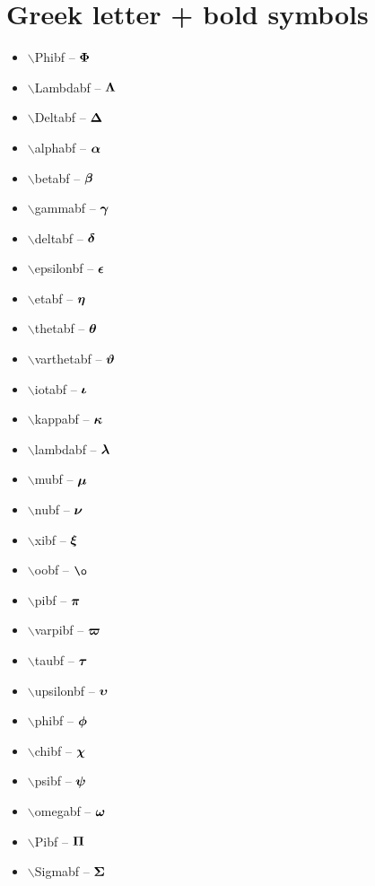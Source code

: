 \documentclass[twocolumn, a4paper]{article}
\begin{document}
	\section{Greek letter + bold symbols}
	\begin{itemize} 
		\item $\backslash$Phibf -- $\boldsymbol{\Phi}$
		\item $\backslash$Lambdabf -- $\boldsymbol{\Lambda}$  
		\item $\backslash$Deltabf -- $\boldsymbol{\Delta}$  
		\item $\backslash$alphabf -- $\boldsymbol{\alpha}$ 
		\item $\backslash$betabf -- $\boldsymbol{\beta}$ 
		\item $\backslash$gammabf -- $\boldsymbol{\gamma}$ 
		\item $\backslash$deltabf -- $\boldsymbol{\delta}$ 
		\item $\backslash$epsilonbf -- $\boldsymbol{\epsilon}$ 
		\item $\backslash$etabf -- $\boldsymbol{\eta}$ 
		\item $\backslash$thetabf -- $\boldsymbol{\theta}$ 
		\item $\backslash$varthetabf -- $\boldsymbol{\vartheta}$ 
		\item $\backslash$iotabf -- $\boldsymbol{\iota}$ 
		\item $\backslash$kappabf -- $\boldsymbol{\kappa}$ 
		\item $\backslash$lambdabf -- $\boldsymbol{\lambda}$ 
		\item $\backslash$mubf -- $\boldsymbol{\mu}$ 
		\item $\backslash$nubf -- $\boldsymbol{\nu}$ 
		\item $\backslash$xibf -- $\boldsymbol{\xi}$ 
		\item $\backslash$oobf -- $\oobf$ 
		\item $\backslash$pibf -- $\boldsymbol{\pi}$
		\item $\backslash$varpibf -- $\boldsymbol{\varpi}$
		\item $\backslash$taubf -- $\boldsymbol{\tau}$
		\item $\backslash$upsilonbf -- $\boldsymbol{\upsilon}$
		\item $\backslash$phibf -- $\boldsymbol{\phi}$
		\item $\backslash$chibf -- $\boldsymbol{\chi}$
		\item $\backslash$psibf -- $\boldsymbol{\psi}$
		\item $\backslash$omegabf -- $\boldsymbol{\omega}$
		\item $\backslash$Pibf -- $\boldsymbol{\Pi}$
		\item $\backslash$Sigmabf -- $\boldsymbol{\Sigma}$		

	\end{itemize}

	
	
	
	
	
\end{document}
